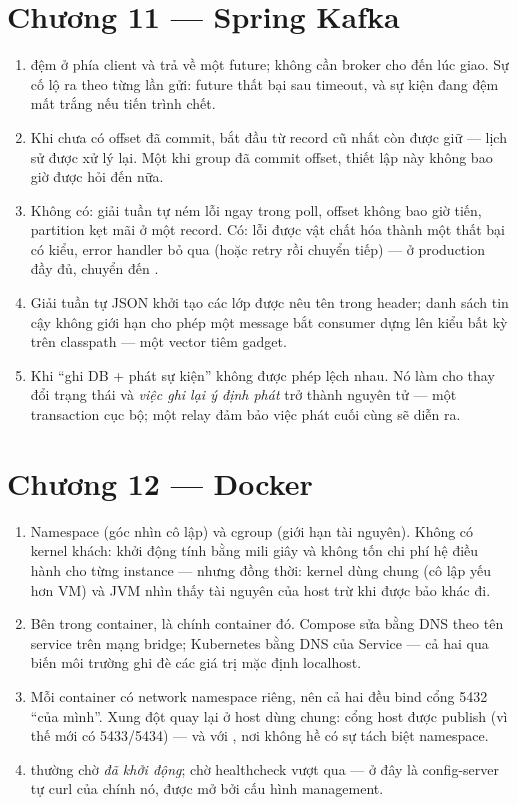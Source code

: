 \section*{Chương 11 --- Spring Kafka}
\begin{enumerate}
  \item {} đệm ở phía client và trả về một future; không
  cần broker cho đến lúc giao. Sự cố lộ ra theo từng lần gửi: future
  thất bại sau timeout, và sự kiện đang đệm mất trắng nếu tiến trình
  chết.
  \item Khi chưa có offset đã commit,  bắt đầu từ record
  cũ nhất còn được giữ --- lịch sử được xử lý lại. Một khi group đã
  commit offset, thiết lập này không bao giờ được hỏi đến nữa.
  \item Không có: giải tuần tự ném lỗi ngay trong poll, offset không
  bao giờ tiến, partition kẹt mãi ở một record. Có: lỗi được vật chất
  hóa thành một thất bại có kiểu, error handler bỏ qua (hoặc retry rồi
  chuyển tiếp) --- ở production đầy đủ, chuyển đến
  .
  \item Giải tuần tự JSON khởi tạo các lớp được nêu tên trong header;
  danh sách tin cậy không giới hạn cho phép một message bắt consumer
  dựng lên kiểu bất kỳ trên classpath --- một vector tiêm gadget.
  \item Khi ``ghi DB + phát sự kiện'' không được phép lệch nhau. Nó
  làm cho thay đổi trạng thái và \emph{việc ghi lại ý định phát} trở
  thành nguyên tử --- một transaction cục bộ; một relay đảm bảo việc
  phát cuối cùng sẽ diễn ra.
\end{enumerate}

\section*{Chương 12 --- Docker}
\begin{enumerate}
  \item Namespace (góc nhìn cô lập) và cgroup (giới hạn tài nguyên).
  Không có kernel khách: khởi động tính bằng mili giây và không tốn chi
  phí hệ điều hành cho từng instance --- nhưng đồng thời: kernel dùng
  chung (cô lập yếu hơn VM) và JVM nhìn thấy tài nguyên của host trừ
  khi được bảo khác đi.
  \item Bên trong container,  là chính container đó.
  Compose sửa bằng DNS theo tên service trên mạng bridge; Kubernetes
  bằng DNS của Service --- cả hai qua biến môi trường ghi đè các giá
  trị mặc định localhost.
  \item Mỗi container có network namespace riêng, nên cả hai đều bind
  cổng 5432 ``của mình''. Xung đột quay lại ở host dùng chung: cổng
  host được publish (vì thế mới có 5433/5434) --- và với
  , nơi không hề có sự tách biệt namespace.
  \item {} thường chờ \emph{đã khởi động};
   chờ healthcheck vượt qua --- ở đây là
  config-server tự curl  của chính nó, được mở
  bởi cấu hình management.
\end{enumerate}

